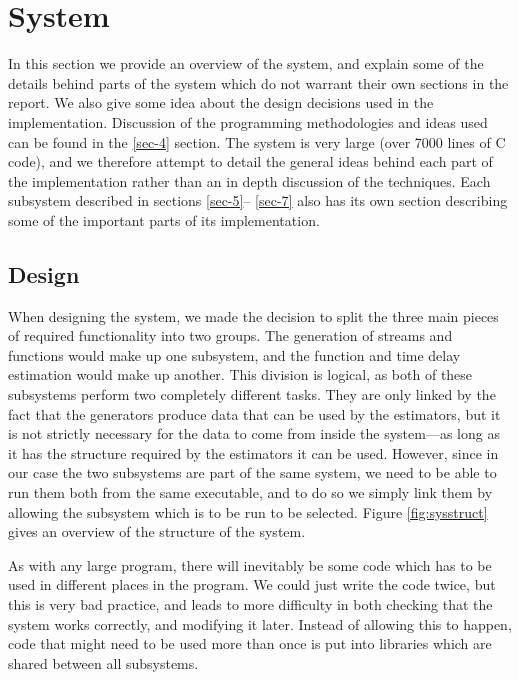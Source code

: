 \documentclass[a4paper,11pt]{article}
\begin{document}
\section{System}
\label{sec-3}

In this section we provide an overview of the system, and explain some of the
details behind parts of the system which do not warrant their own sections in
the report. We also give some idea about the design decisions used in the
implementation. Discussion of the programming methodologies and ideas used can
be found in the \ref{sec-4} section. The system is very large (over 7000 lines
of C code), and we therefore attempt to detail the general ideas behind each
part of the implementation rather than an in depth discussion of the
techniques. Each subsystem described in sections \ref{sec-5}--
\ref{sec-7} also has its own section describing some of the important
parts of its implementation.
\subsection{Design}
\label{sec-3-1}

   When designing the system, we made the decision to split the three main
   pieces of required functionality into two groups. The generation of streams
   and functions would make up one subsystem, and the function and time delay
   estimation would make up another. This division is logical, as both of these
   subsystems perform two completely different tasks. They are only linked by
   the fact that the generators produce data that can be used by the estimators,
   but it is not strictly necessary for the data to come from inside the
   system---as long as it has the structure required by the estimators it can be
   used. However, since in our case the two subsystems are part of the same
   system, we need to be able to run them both from the same executable, and to
   do so we simply link them by allowing the subsystem which is to be run to be
   selected. Figure \ref{fig:sysstruct} gives an overview of the structure of
   the system.

   As with any large program, there will inevitably be some code which has to be
   used in different places in the program. We could just write the code twice,
   but this is very bad practice, and leads to more difficulty in both checking
   that the system works correctly, and modifying it later. Instead of allowing
   this to happen, code that might need to be used more than once is put into
   libraries which are shared between all subsystems.
\end{document}
